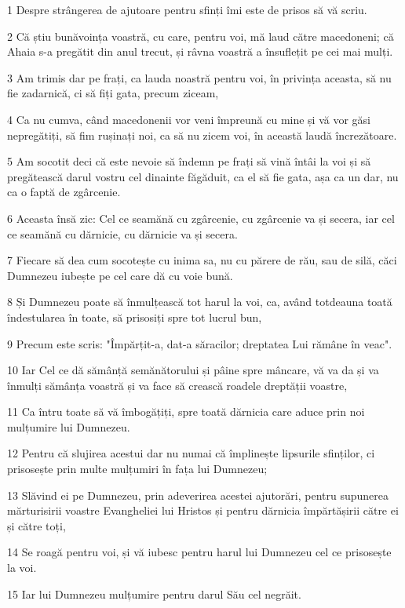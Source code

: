 \par 1 Despre strângerea de ajutoare pentru sfinți îmi este de prisos să vă scriu.
\par 2 Că știu bunăvoința voastră, cu care, pentru voi, mă laud către macedoneni; că Ahaia s-a pregătit din anul trecut, și râvna voastră a însuflețit pe cei mai mulți.
\par 3 Am trimis dar pe frați, ca lauda noastră pentru voi, în privința aceasta, să nu fie zadarnică, ci să fiți gata, precum ziceam,
\par 4 Ca nu cumva, când macedonenii vor veni împreună cu mine și vă vor găsi nepregătiți, să fim rușinați noi, ca să nu zicem voi, în această laudă încrezătoare.
\par 5 Am socotit deci că este nevoie să îndemn pe frați să vină întâi la voi și să pregătească darul vostru cel dinainte făgăduit, ca el să fie gata, așa ca un dar, nu ca o faptă de zgârcenie.
\par 6 Aceasta însă zic: Cel ce seamănă cu zgârcenie, cu zgârcenie va și secera, iar cel ce seamănă cu dărnicie, cu dărnicie va și secera.
\par 7 Fiecare să dea cum socotește cu inima sa, nu cu părere de rău, sau de silă, căci Dumnezeu iubește pe cel care dă cu voie bună.
\par 8 Și Dumnezeu poate să înmulțească tot harul la voi, ca, având totdeauna toată îndestularea în toate, să prisosiți spre tot lucrul bun,
\par 9 Precum este scris: "Împărțit-a, dat-a săracilor; dreptatea Lui rămâne în veac".
\par 10 Iar Cel ce dă sămânță semănătorului și pâine spre mâncare, vă va da și va înmulți sămânța voastră și va face să crească roadele dreptății voastre,
\par 11 Ca întru toate să vă îmbogățiți, spre toată dărnicia care aduce prin noi mulțumire lui Dumnezeu.
\par 12 Pentru că slujirea acestui dar nu numai că împlinește lipsurile sfinților, ci prisosește prin multe mulțumiri în fața lui Dumnezeu;
\par 13 Slăvind ei pe Dumnezeu, prin adeverirea acestei ajutorări, pentru supunerea mărturisirii voastre Evangheliei lui Hristos și pentru dărnicia împărtășirii către ei și către toți,
\par 14 Se roagă pentru voi, și vă iubesc pentru harul lui Dumnezeu cel ce prisosește la voi.
\par 15 Iar lui Dumnezeu mulțumire pentru darul Său cel negrăit.

